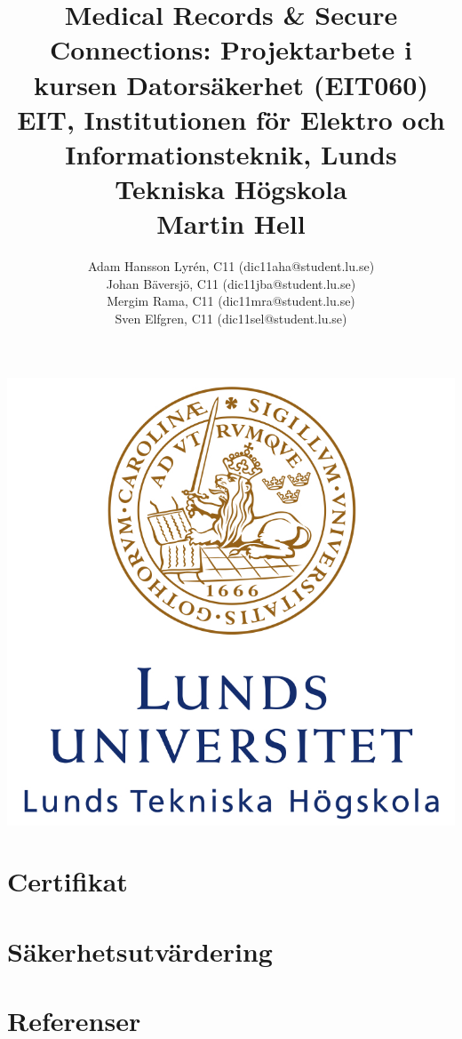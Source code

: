\documentclass[a4paper]{article}
\title{
	Medical Records \& Secure Connections: Projektarbete i kursen Datorsäkerhet (EIT060)\\
	EIT, Institutionen för Elektro och Informationsteknik, Lunds Tekniska Högskola\\
	Martin Hell}
\author{
Adam Hansson Lyrén, C11 (dic11aha@student.lu.se)\\
Johan Bäversjö, C11 (dic11jba@student.lu.se)\\
Mergim Rama, C11 (dic11mra@student.lu.se)\\
Sven Elfgren, C11 (dic11sel@student.lu.se)\\
}
\begin{document}

\maketitle
\centerline{\includegraphics[scale = 0.6]{LTH.JPG}}
\thispagestyle{empty}
\newpage
\setcounter{page}{1}


\tableofcontents
\newpage







\section{Certifikat}


\section{Säkerhetsutvärdering}


\section{Referenser}

\end{document}
